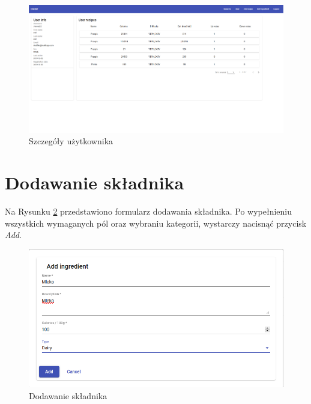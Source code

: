 \begin{figure}[H]
\includegraphics[width=\textwidth]{screeny/user.png}
\caption{Szczegóły użytkownika}
\label{fig:user}
\end{figure}

\section{Dodawanie składnika}
Na Rysunku \ref{fig:ingredient} przedstawiono formularz dodawania składnika. Po wypełnieniu wszystkich wymaganych pól oraz wybraniu kategorii, wystarczy nacisnąć przycisk \textit{Add}.

\begin{figure}[H]
\includegraphics[width=\textwidth]{screeny/dodaj-skladnik.png}
\caption{Dodawanie składnika}
\label{fig:ingredient}
\end{figure}
